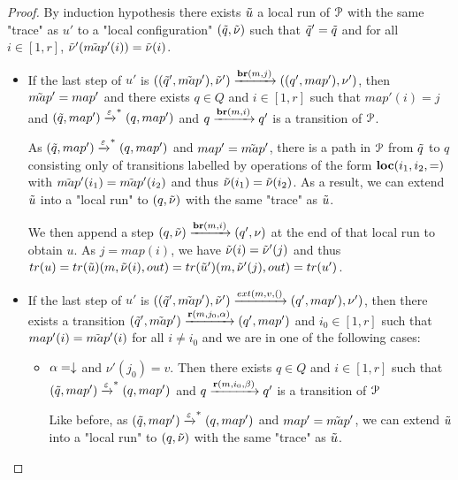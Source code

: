 \begin{proof}
	By induction hypothesis there exists $\Tilde{u}$ a local run of $\mathcal{P}$ with the same "trace" as $u'$ to a "local configuration" $(\Tilde{q}, \Tilde{\nu})$ such that $\Tilde{q}'=\Tilde{q}$ and for all $i \in [1,r]$, $\Tilde{\nu}'(\Tilde{map}'(i)) = \Tilde{\nu}(i)$.
	
	\begin{itemize}
		\item If the last step of $u'$ is $((\Tilde{q}', \Tilde{map}'), \Tilde{\nu}') \xrightarrow{\textbf{br}(m, j)} ((q', map'), \nu')$, then $\Tilde{map}' = map'$ and there exists $q \in Q$ and $i \in [1,r]$ such that $map'(i)=j$ and $(\Tilde{q}, map') \xrightarrow{\varepsilon}^* (q, map')$ and $q \xrightarrow{\textbf{br}(m, i)} q'$ is a transition of $\mathcal{P}$.
		
		As $(\Tilde{q}, map') \xrightarrow{\varepsilon}^* (q, map')$ and $map'=\Tilde{map}'$, there is a path in $\mathcal{P}$ from $\Tilde{q}$ to $q$ consisting only of transitions labelled by operations of the form $\textbf{loc}(i_1,i_2,{=})$ with $\Tilde{map}'(i_1) = \Tilde{map}'(i_2)$ and thus $\Tilde{\nu}(i_1) = \Tilde{\nu}(i_2)$.
		As a result, we can extend $\Tilde{u}$ into a "local run" to $(q, \Tilde{\nu})$ with the same  "trace" as $\Tilde{u}$.
		
		We then append a step $(q, \Tilde{\nu}) \xrightarrow{\textbf{br}(m, i)} (q', \nu)$ at the end of that local run to obtain $u$. As $j = map(i)$, we have $\Tilde{\nu}(i) = \Tilde{\nu}'(j)$ and thus $\trace{u} = \trace{\Tilde{u}}(m, \Tilde{\nu}(i), out) = \trace{\Tilde{u}'}(m, \Tilde{\nu}'(j), out) = \trace{u'}$.
		
		\item If the last step of $u'$ is $((\Tilde{q}', \Tilde{map}'), \Tilde{\nu}') \extbr{m, v} ((q', map'), \nu')$, then there exists a transition  $(\Tilde{q}', \Tilde{map}') \xrightarrow{\textbf{r}(m, j_0, \alpha)} (q', map')$ and $i_0 \in [1,r]$ such that $map'(i) = \Tilde{map}'(i)$ for all $i\neq i_0$ and we are in one of the following cases:
		
		\begin{itemize}
			\item $\alpha = \downarrow$ and $\nu'(j_0)=v$. Then there exists $q \in Q$ and $i \in [1,r]$ such that $(\Tilde{q}, map') \xrightarrow{\varepsilon}^* (q, map')$ and $q \xrightarrow{\textbf{r}(m, i_0, \beta)} q'$ is a transition of $\mathcal{P}$
			
			Like before, as $(\Tilde{q}, map') \xrightarrow{\varepsilon}^* (q, map')$ and $map'=\Tilde{map}'$, we can extend $\Tilde{u}$ into a "local run" to $(q, \Tilde{\nu})$ with the same  "trace" as $\Tilde{u}$.
			

\end{itemize}
\end{itemize}
\end{proof}
